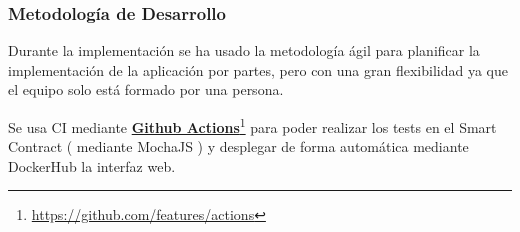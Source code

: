 \subsubsection{Metodología de Desarrollo}

Durante la implementación se ha usado la metodología ágil para planificar la implementación de la aplicación por partes, pero con una gran flexibilidad ya que el equipo solo está formado por una persona. 

\bigskip

Se usa CI mediante \textcolor{blue}{\href{https://github.com/features/actions}{\textbf{Github Actions}}}\footnote{\url{https://github.com/features/actions}} para poder realizar los tests en el Smart Contract ( mediante MochaJS ) y desplegar de forma automática mediante DockerHub la interfaz web.